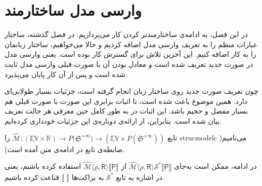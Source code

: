 \chapter{وارسی مدل ساختارمند}

در این فصل، به ادامه‌ی ساختارمندتر کردن کار می‌پردازیم. در فصل گذشته، ساختار عبارات منظم را به تعریف وارسی مدل اضافه کردیم و حالا می‌خواهیم، ساختار زبانمان را به کار اضافه کنیم. این آخرین تلاش \cite{calcul} برای گسترش کار بوده است. یعنی وارسی مدل در صورت جدید تعریف شده است و معادل بودن آن با صورت قبلی وارسی مدل ثابت شده است و پس از آن کار پایان می‌پذیرد. 

چون تعریف صورت جدید روی ساختار زبان انجام گرفته است، جزئیات بسیار طولانی‌ای دارد. همین موضوع باعث شده است، تا اثبات‌ برابری این صورت با صورت قبلی هم بسیار مفصل و حجیم باشد. این اثبات در \cite{calcul} به طور کامل حین معرفی هر حالت تعریف بیان شده است. بنابراین، از ارائه‌ی دوباره‌ی این جزئیات خودداری کرده‌ایم.

\begin{defn}
	
تابع
$\mathcal{\hat{M}}:
\mathbb{(\underline{EV} \times R)} \rightarrow  \mathit{P}({\mathfrak{S}^{+\infty})}
\rightarrow ( \mathbb{\underline{EV}} \times \mathit{P}(\mathfrak{S}^{+\infty})) $
را
\gls{strucmodelc}
 می‌نامیم( ضابطه‌ی تابع در ادامه‌ی متن آمده است).
\end{defn}
در ادامه، ممکن است به‌جای 
$\mathcal{\hat{M}}\langle \underline{\rho}, \mathsf{R} \rangle \mathcal{S}^* \llbracket \mathsf{P} \rrbracket$
از 
$\mathcal{\hat{M}}\langle \underline{\rho}, \mathsf{R} \rangle \llbracket \mathsf{P} \rrbracket$
استفاده کرده باشیم، یعنی در اشاره به تابع $\mathcal{S}^*$ به براکت‌ها
$\llbracket \; \rrbracket$
قناعت کرده باشیم.



